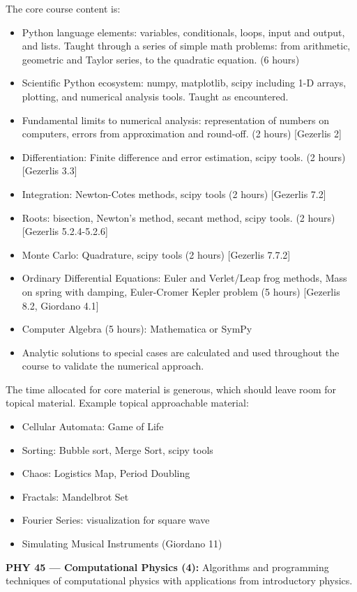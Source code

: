 \documentclass[12pt]{article}
\begin{document}
The core course content is:
\begin{itemize}
\item Python language elements:  variables, conditionals, loops, input and output, and lists. Taught through a series of simple math problems: from arithmetic, geometric and Taylor series, to the quadratic equation. (6 hours)
\item Scientific Python ecosystem:  numpy, matplotlib, scipy including 1-D arrays, plotting, and numerical analysis tools.  Taught as encountered.
\item Fundamental limits to numerical analysis:  representation of numbers on computers, errors from approximation and round-off. (2 hours) [Gezerlis 2]
\item Differentiation:  Finite difference and error estimation, scipy tools. (2 hours) [Gezerlis 3.3]
\item Integration:  Newton-Cotes methods, scipy tools (2 hours) [Gezerlis 7.2]
\item Roots: bisection, Newton's method, secant method, scipy tools. (2 hours) [Gezerlis 5.2.4-5.2.6]
\item Monte Carlo: Quadrature, scipy tools (2 hours) [Gezerlis 7.7.2]
\item Ordinary Differential Equations:  Euler and Verlet/Leap frog methods, Mass on spring with damping, Euler-Cromer Kepler problem (5 hours) [Gezerlis 8.2, Giordano 4.1]
\item Computer Algebra (5 hours):  Mathematica or SymPy
\item Analytic solutions to special cases are calculated and used throughout the
  course to validate the numerical approach.
\end{itemize}
The time allocated for core material is generous, which should leave room for topical material.  Example topical approachable material:
\begin{itemize}
\item Cellular Automata:  Game of Life
\item Sorting:  Bubble sort, Merge Sort, scipy tools
\item Chaos:  Logistics Map, Period Doubling
\item Fractals: Mandelbrot Set
\item Fourier Series:  visualization for square wave
\item Simulating Musical Instruments (Giordano 11)
\end{itemize}

\vskip 1cm
\noindent
{\bf PHY 45 --- Computational Physics (4):}
Algorithms and programming techniques of computational physics
with applications from introductory physics.
\end{document}
